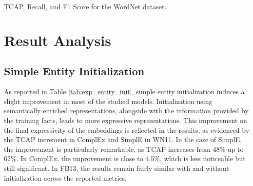 \begin{table}[htp]
\caption{TCAP, Recall, and F1 Score for the WordNet dataset.} \label{tab:ookb_wn}

\caption{Top: (a) metrics obtained for the Freebase dataset. DBOnt refers to the DBpedia ontology, and GKGOnt to the Google Knowledge Graph Ontology. Bottom: (b) metrics obtained for the WordNet dataset. Entity initialization is used in all instances}
\label{tab:OOKB_exp}
\end{table}

\section{Result Analysis}
\subsection{Simple Entity Initialization}
As reported in Table \ref{tab:exp_entity_init}, simple entity initialization induces a slight improvement in most of the studied models. Initialization using semantically enriched representations, alongside with the information provided by the training facts, leads to more expressive representations. This improvement on the final expressivity of the embeddings is reflected in the results, as evidenced by the TCAP increment in ComplEx and SimplE in WN11. In the case of SimplE, the improvement is particularly remarkable, as TCAP increases from 48\% up to 62\%. In ComplEx, the improvement is close to 4.5\%, which is less noticeable but still significant. In FB13, the results remain fairly similar with and without initialization across the reported metrics.

